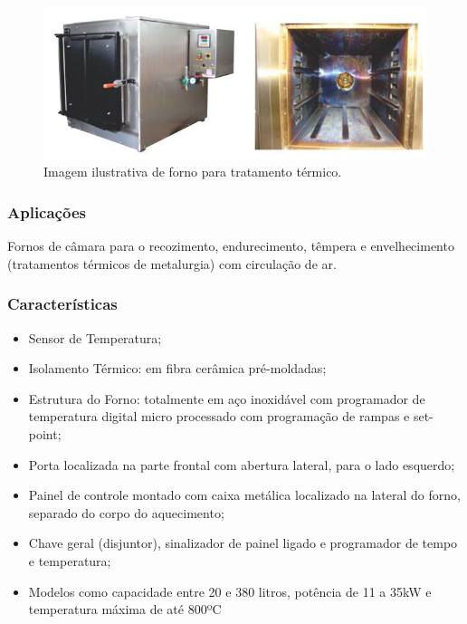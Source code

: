 \begin{figure}[!h]
	\centering
	\label{forno_mufla}
	\includegraphics[keepaspectratio=true,scale=0.8]{figuras/forno_mufla.JPG}
	\caption{Imagem ilustrativa de forno para tratamento térmico.}
\end{figure}

\subsubsection{Aplicações}

Fornos de câmara para o recozimento, endurecimento, têmpera e envelhecimento (tratamentos térmicos de metalurgia) com circulação de ar.

\subsubsection{Características}

\begin{itemize}
	\item Sensor de Temperatura;
	\item Isolamento Térmico: em fibra cerâmica pré-moldadas;
	\item Estrutura do Forno: totalmente em aço inoxidável com programador de temperatura digital micro processado com programação de rampas e set-point;
	\item Porta localizada na parte frontal com abertura lateral, para o lado esquerdo;
	\item Painel de controle montado com caixa metálica localizado na lateral do forno, separado do corpo do aquecimento;
	\item Chave geral (disjuntor), sinalizador de painel ligado e programador de tempo e temperatura;
	\item Modelos como capacidade entre 20 e 380 litros, potência de 11 a 35kW e temperatura máxima de até 800ºC
	
\end{itemize}

